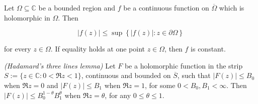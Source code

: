 \begin{theorem*}
	Let $\Omega \subseteq \mathbb{C}$ be a bounded region and $f$ be a continuous function on $\overline{\Omega}$ which is holomorphic in $\Omega$. Then 

	\begin{equation*}
		\left| f(z)\right| \leqslant \sup\left\{ \left|f(z) \right| : z \in \partial\Omega\right\}
	\end{equation*}

	for every $z \in \Omega$. If equality holds at one point $z \in \Omega$, then $f$ is constant.
\end{theorem*}

\begin{mdframed}
	\begin{lemma*}\emph{(Hadamard's three lines lemma)}
		Let $F$ be a holomorphic function in the strip $S := \{z \in \mathbb{C}: 0 < \Re z < 1\}$, continuous and bounded on $\overline{S}$, such that $\left| F(z)\right| \leqslant B_0$ when $\Re z = 0$ and $\left| F(z) \right| \leqslant B_1$ when $\Re z = 1$, for some $0 < B_0,B_1 < \infty$. Then $\left| F(z) \right| \leqslant B_0^{1 - \theta}B_1^\theta$ when $\Re z = \theta$, for any $0 \leqslant \theta \leqslant 1$.
	\end{lemma*}
\end{mdframed}

